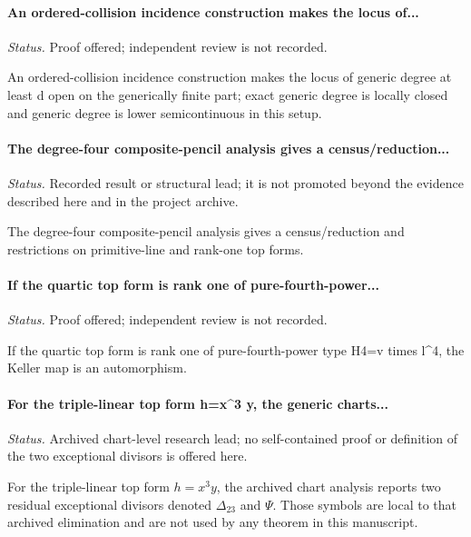 \label{supp-note-02-003}
\paragraph{An ordered-collision incidence construction makes the locus of...}
\emph{Status.} Proof offered; independent review is not recorded.

An ordered-collision incidence construction makes the locus of generic degree at least d open on the generically finite part; exact generic degree is locally closed and generic degree is lower semicontinuous in this setup.

\label{supp-note-02-004}
\paragraph{The degree-four composite-pencil analysis gives a census/reduction...}
\emph{Status.} Recorded result or structural lead; it is not promoted beyond the evidence described here and in the project archive.

The degree-four composite-pencil analysis gives a census/reduction and restrictions on primitive-line and rank-one top forms.

\label{supp-note-02-005}
\paragraph{If the quartic top form is rank one of pure-fourth-power...}
\emph{Status.} Proof offered; independent review is not recorded.

If the quartic top form is rank one of pure-fourth-power type H4=v times l\textasciicircum{}4, the Keller map is an automorphism.

\label{supp-note-02-006}
\paragraph{For the triple-linear top form h=x\textasciicircum{}3 y, the generic charts...}
\emph{Status.} Archived chart-level research lead; no self-contained proof or
definition of the two exceptional divisors is offered here.

For the triple-linear top form \(h=x^3y\), the archived chart analysis
reports two residual exceptional divisors denoted \(\Delta_{23}\) and
\(\Psi\).  Those symbols are local to that archived elimination and are
not used by any theorem in this manuscript.

\label{supp-note-02-007}
